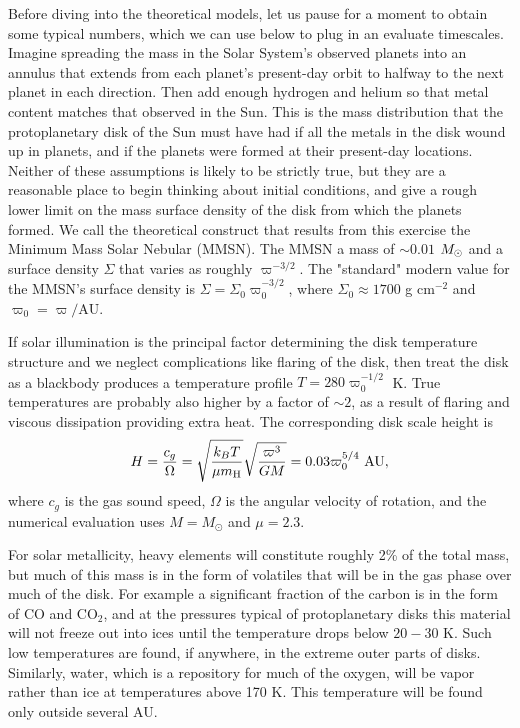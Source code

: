 Before diving into the theoretical models, let us pause for a moment to obtain some typical numbers, which we can use below to plug in an evaluate timescales. Imagine spreading the mass in the Solar System's observed planets into an annulus that extends from each planet's present-day orbit to halfway to the next planet in each direction. Then add enough hydrogen and helium so that metal content matches that observed in the Sun. This is the mass distribution that the protoplanetary disk of the Sun must have had if all the metals in the disk wound up in planets, and if the planets were formed at their present-day locations. Neither of these assumptions is likely to be strictly true, but they are a reasonable place to begin thinking about initial conditions, and give a rough lower limit on the mass surface density of the disk from which the planets formed. We call the theoretical construct that results from this exercise the Minimum Mass Solar Nebular (MMSN). The MMSN a mass of $\sim 0.01$ $M_{\odot}$ and a surface density $\Sigma$ that varies as roughly $\varpi^{-3/2}$. The "standard" modern value for the MMSN's surface density is $\Sigma=\Sigma_0 \varpi_0^{-3/2}$, where $\Sigma_0 \approx 1700$ g cm$^{-2}$ and $\varpi_0=\varpi/\mbox{AU}$.

If solar illumination is the principal factor determining the disk temperature structure and we neglect complications like flaring of the disk, then treat the disk as a blackbody produces a temperature profile $T=280 \varpi_0^{-1/2}$ K. True temperatures are probably also higher by a factor of $\sim 2$, as a result of flaring and viscous dissipation providing extra heat. The corresponding disk scale height is
\begin{equation}
H = \frac{c_g}{\Omega} = \sqrt{\frac{k_B T}{\mu m_{\rm H}}} \sqrt{\frac{\varpi^3}{GM}} = 0.03 \varpi_0^{5/4}\mbox{ AU},
\end{equation}
where $c_g$ is the gas sound speed, $\Omega$ is the angular velocity of rotation, and the numerical evaluation uses $M = M_\odot$ and $\mu=2.3$.

For solar metallicity, heavy elements will constitute roughly 2\% of the total mass, but much of this mass is in the form of volatiles that will be in the gas phase over much of the disk. For example a significant fraction of the carbon is in the form of CO and CO$_2$, and at the pressures typical of protoplanetary disks this material will not freeze out into ices until the temperature drops below $20-30$ K. Such low temperatures are found, if anywhere, in the extreme outer parts of disks. Similarly, water, which is a repository for much of the oxygen, will be vapor rather than ice at temperatures above 170 K. This temperature will be found only outside several AU.


